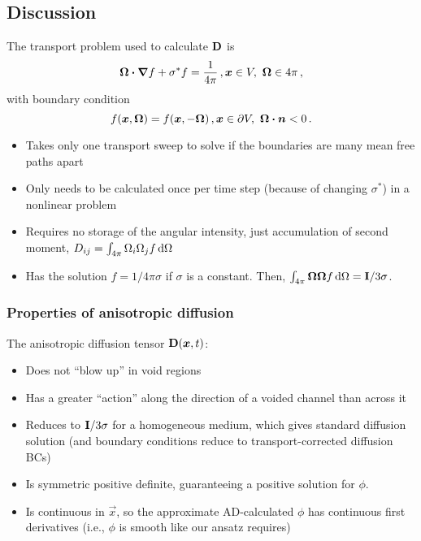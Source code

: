 \documentclass{beamer}
\begin{document}
\subsection{Discussion}
\begin{frame}
  The transport problem used to calculate $\mathbf{D}$ is
  \begin{equation*}
    \bm{\Omega}\bm{\cdot} \bm{\nabla} f + \sigma^* f = \frac{1}{4\pi} \,, \bm{x} \in V,\
    \bm{\Omega}\in 4\pi\,,
  \end{equation*}
  with boundary condition
  \begin{equation*}
    f(\bm{x}, \bm{\Omega}) = f(\bm{x}, -\bm{\Omega}) \,, \bm{x} \in
    \partial V,\ \bm{\Omega} \bm{\cdot} \bm{n} < 0\,.
  \end{equation*}
  \vspace{-\baselineskip}
  \begin{itemize}
    \item Takes only one transport sweep to solve if the boundaries are many
      mean free paths apart
    \item Only needs to be calculated once per time step (because of changing
      $\sigma^*$) in a nonlinear problem \item Requires no storage of the
      angular intensity, just accumulation of second moment, $D_{ij} =
      \int_{4\pi} \Omega_i \Omega_j f \mathop{}\!\mathrm{d}\Omega$
    \item Has the solution $f=1/4\pi\sigma$ if $\sigma$ is a constant.
      Then, $\int_{4\pi} \bm{\Omega} \bm{\Omega} f \mathop{}\!\mathrm{d}\Omega =
      \mathbf{I}/3\sigma$.
  \end{itemize}
\end{frame}

\begin{frame}
  \frametitle{Properties of anisotropic diffusion}

  The anisotropic diffusion tensor $\mathbf{D}(\bm{x},t)$: 
  \begin{itemize}
    \item Does not ``blow up'' in void regions
    \item Has a greater ``action'' along the direction of a voided channel than
      across it
    \item Reduces to $\mathbf{I}/3\sigma$ for a homogeneous
      medium, which gives standard diffusion solution (and boundary conditions
      reduce to transport-corrected diffusion BCs)
    \item Is symmetric positive definite, guaranteeing a positive solution
      for $\phi$.
    \item Is continuous in $\vec{x}$, so the approximate AD-calculated $\phi$
      has continuous first derivatives (i.e., $\phi$ is smooth like our ansatz
      requires)
  \end{itemize}

\end{frame}
\end{document}
